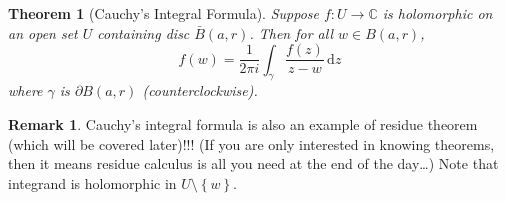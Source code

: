 \documentclass[a4paper, 12pt]{article}
\newtheorem{theorem}{Theorem}
\theoremstyle{definition}
\newtheorem{remark}{Remark}
\numberwithin{theorem}{section}
\numberwithin{definition}{section}
\numberwithin{exercise}{section}
\numberwithin{remark}{section}
\numberwithin{figure}{section}
\numberwithin{example}{section}
\newcommand{\C}{\mathbb{C}}
\newcommand{\intd}{\,\text{d}}
\begin{document}
\begin{theorem}[Cauchy's Integral Formula]
    Suppose $f:U \rightarrow \C$ is holomorphic on an open set $U$ containing disc $\bar B (a,r)$.
    Then for all $w \in B \left( a,r \right)$,
    \begin{equation*}
        f(w) = \frac{1}{2\pi i} \int_{\gamma} \frac{f(z)}{z-w} \intd z
    \end{equation*}
    where $\gamma$ is $\partial B (a,r)$ (counterclockwise).
\end{theorem}
\begin{remark}
    Cauchy's integral formula is also an example of residue theorem (which will be covered later)!!!
    (If you are only interested in knowing theorems, then it means
    residue calculus is all you need at the end of the day\dots)
    Note that integrand is holomorphic in $U \setminus \left\{ w \right\}$.
\end{remark}
\end{document}
